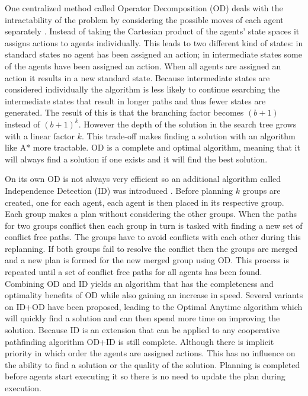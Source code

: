One centralized method called Operator Decomposition (OD) deals with the
intractability of the problem by considering the possible moves of each agent
separately \cite{standley2010,standley2011}. Instead of taking the Cartesian
product of
the agents' state spaces it assigns actions to agents individually. This leads
to two different kind of states: in standard states no agent has been assigned
an action; in intermediate states some of the agents have been assigned an
action. When all agents are assigned an action it results in a new standard
state. Because intermediate states are considered individually the algorithm is
less likely to continue searching the intermediate states that result in longer
paths and thus
fewer states are generated. The result of this is that the branching factor
becomes $(b+1)$ instead of $(b+1)^k$. However the depth of the solution in the
search tree grows with a linear factor $k$. This trade-off makes finding a
solution with an algorithm like
A* more tractable. OD is a complete and optimal algorithm, meaning that it will
always find a solution if one exists and it will find the best solution.

On its own OD is not always very efficient so an additional algorithm called
Independence Detection (ID) was introduced \cite{standley2010}. Before planning
$k$ groups are created, one for each agent, each agent is then placed in its
respective group. Each group makes a plan without considering the other groups.
When the paths for two groups conflict then each group in turn is tasked with
finding a new set of conflict free paths. The groups have to avoid conflicts
with each other during this replanning. If both groups fail to resolve the 
conflict
then the groups are merged and a new plan is formed for the new merged group
using OD. This process is repeated until a set of conflict free paths for all
agents has been found. Combining OD and ID yields an algorithm that has the
completeness and optimality benefits of OD while also gaining an increase in
speed. Several variants on
ID+OD have been proposed, leading to the Optimal Anytime algorithm
\cite{standley2011} which will quickly find a solution and can then spend more
time on improving the solution. Because ID is an extension that can be applied
to any cooperative pathfinding algorithm OD+ID is still complete. Although
there is implicit priority in which order the agents are assigned actions. This
has no influence on the ability to find a solution or the quality of the
solution. Planning is completed before agents start executing it so there is
no need to update the plan during execution.

